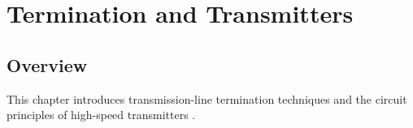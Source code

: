 \chapter{Termination and Transmitters}

\section{Overview}

This chapter introduces transmission-line termination techniques
and the circuit principles of high-speed transmitters
\citep{palermo2025ecen720}.





